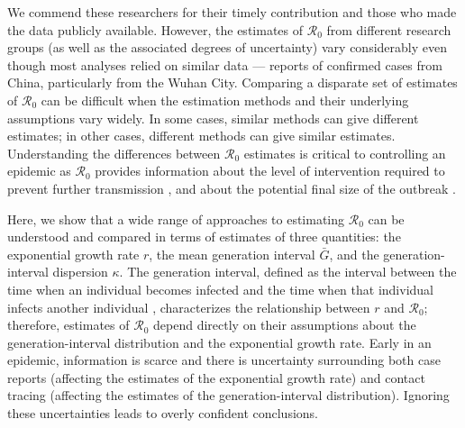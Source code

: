 \documentclass[12pt]{article}
\newcommand{\Ro}{\ensuremath{{\mathcal R}_{0}}\xspace}
\begin{document}
We commend these researchers for their timely contribution and those who made the data publicly available.
However, the estimates of \Ro from different research groups (as well as the associated degrees of uncertainty) vary considerably even though most analyses relied on similar data --- reports of confirmed cases from China, particularly from the Wuhan City.
Comparing a disparate set of estimates of \Ro can be difficult when the estimation methods and their underlying assumptions vary widely.
In some cases, similar methods can give different estimates; in other cases, different methods can give similar estimates.
Understanding the differences between \Ro estimates is critical to controlling an epidemic as \Ro provides information about the level of intervention required to prevent further transmission \citep{anderson1991infectious}, and about the potential final size of the outbreak \citep{anderson1991infectious, ma2006generality}.

Here, we show that a wide range of approaches to estimating \Ro can be understood and compared in terms of estimates of three quantities: the exponential growth rate $r$, the mean generation interval $\bar G$, and the generation-interval dispersion $\kappa$.
The generation interval, defined as the interval between the time when an individual becomes infected and the time when that individual infects another individual \citep{svensson2007note}, characterizes the relationship between $r$ and \Ro \citep{wearing2005appropriate, roberts2007model, wallinga2007generation, park2019practical};
therefore, estimates of \Ro depend directly on their assumptions about the generation-interval distribution and the exponential growth rate.
Early in an epidemic, information is scarce and there is uncertainty surrounding both case reports (affecting the estimates of the exponential growth rate) and contact tracing (affecting the estimates of the generation-interval distribution).
Ignoring these uncertainties leads to overly confident conclusions.
\end{document}
